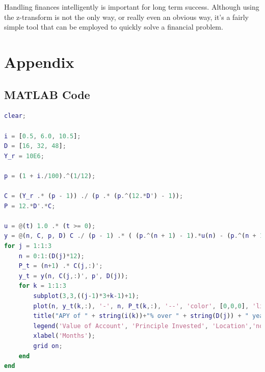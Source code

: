 \documentclass[letterpaper]{article}
\begin{document}
Handling finances intelligently is important for long term success. Although using the z-transform is not the only way, or really even an obvious way, it's a fairly simple tool that can be employed to quickly solve a financial problem. 

\pagebreak
\section{Appendix}
\subsection{MATLAB Code}
\begin{lstlisting}[language=MATLAB]
clear;

i = [0.5, 6.0, 10.5];
D = [16, 32, 48];
Y_r = 10E6;

p = (1 + i./100).^(1/12);

C = (Y_r .* (p - 1)) ./ (p .* (p.^(12.*D') - 1));
P = 12.*D'.*C;

u = @(t) 1.0 .* (t >= 0);
y = @(n, C, p, D) C ./ (p - 1) .* ( (p.^(n + 1) - 1).*u(n) - (p.^(n + 1 - 12*D) - 1).*u(n - 12*D));
for j = 1:1:3
	n = 0:1:(D(j)*12);
	P_t = (n+1) .* C(j,:)';
	y_t = y(n, C(j,:)', p', D(j));
	for k = 1:1:3     
		subplot(3,3,((j-1)*3+k-1)+1);
		plot(n, y_t(k,:), '-', n, P_t(k,:), '--', 'color', [0,0,0], 'linewidth', 1);
		title("APY of " + string(i(k))+"% over " + string(D(j)) + " years");
		legend('Value of Account', 'Principle Invested', 'Location','northwest');
		xlabel('Months');
		grid on;
	end
end
\end{lstlisting}
\end{document}
